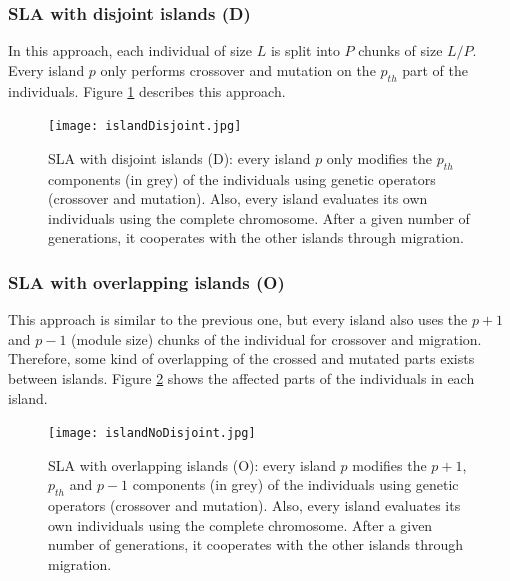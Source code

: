 \documentclass[preprint]{elsarticle}
\begin{document}
\subsubsection{SLA with disjoint islands (D)} 
In this approach, each individual of size $L$ is split into $P$ chunks
of size $L/P$. Every island $p$ only performs crossover and mutation
on the $p_{th}$ part of the individuals. Figure \ref{fig:disjoint}
describes this approach.
%
\begin{figure}[h!tb]
\centering
\texttt{[image: islandDisjoint.jpg]}
\caption{SLA with disjoint islands (D): every island $p$ only modifies the $p_{th}$ components (in grey) of the individuals using genetic operators (crossover and mutation). Also, every island evaluates its own individuals using the complete chromosome. After a given number of generations, it cooperates with the other islands through migration.}
\label{fig:disjoint}
\end{figure}

\subsubsection{SLA with overlapping islands (O)}
This approach is similar to the previous one, but every island also uses the $p+1$ and $p-1$ (module size) chunks of the individual for crossover and migration. Therefore, some kind of overlapping of the crossed and mutated parts exists between islands. Figure \ref{fig:overlapping} shows the affected parts of the individuals in
each island. 

\begin{figure}[h!tb]
\centering
\texttt{[image: islandNoDisjoint.jpg]}
\caption{SLA with overlapping islands (O): every island $p$ modifies the  $p+1$,
  $p_{th}$ and $p-1$  components (in grey) of the individuals using genetic operators (crossover and mutation). Also, every island evaluates its own individuals using the complete chromosome. After a given number of generations, it cooperates with the other islands through migration.}
  \label{fig:overlapping}
\end{figure}
\end{document}
